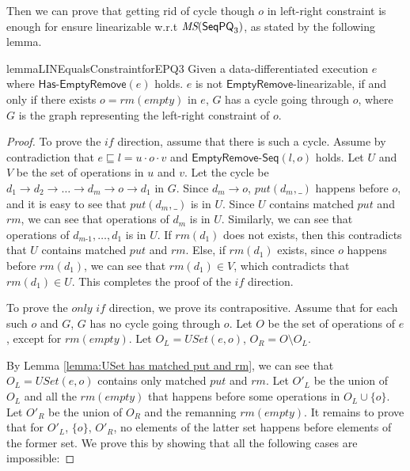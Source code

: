 Then we can prove that getting rid of cycle though $o$ in left-right constraint is enough for ensure linearizable w.r.t $\textit{MS}(\mathsf{SeqPQ}_3)$, as stated by the following lemma.


\begin{restatable}{lemma}{LINEqualsConstraintforEPQ3}
\label{lemma:Lin Equals Constraint for EPQ3}
Given a data-differentiated execution $e$ where $\mathsf{Has\text{-}EmptyRemove}(e)$ holds. $e$ is not $\mathsf{EmptyRemove}$-linearizable, if and only if there exists $o = \textit{rm}(\textit{empty})$ in $e$, $G$ has a cycle going through $o$, where $G$ is the graph representing the left-right constraint of $o$. 
\end{restatable}

\begin {proof}

To prove the $\textit{if}$ direction, assume that there is such a cycle. Assume by contradiction that $e \sqsubseteq l= u \cdot o \cdot v$ and $\mathsf{EmptyRemove\text{-}Seq}(l,o)$ holds. Let $U$ and $V$ be the set of operations in $u$ and $v$. Let the cycle be $d_1 \rightarrow d_2 \rightarrow \ldots \rightarrow d_m \rightarrow o \rightarrow d_1$ in $G$. Since $d_m \rightarrow o$, $\textit{put}(d_m,\_)$ happens before $o$, and it is easy to see that $\textit{put}(d_m,\_)$ is in $U$. Since $U$ contains matched $\textit{put}$ and $\textit{rm}$, we can see that operations of $d_m$ is in $U$. Similarly, we can see that operations of $d_{\textit{m-1}},\ldots,d_1$ is in $U$. If $\textit{rm}(d_1)$ does not exists, then this contradicts that $U$ contains matched $\textit{put}$ and $\textit{rm}$. Else, if $\textit{rm}(d_1)$ exists, since $o$ happens before $\textit{rm}(d_1)$, we can see that $\textit{rm}(d_1) \in V$, which contradicts that $\textit{rm}(d_1) \in U$. This completes the proof of the $\textit{if}$ direction.

To prove the $\textit{only if}$ direction, we prove its contrapositive. Assume that for each such $o$ and $G$, $G$ has no cycle going through $o$. Let $O$ be the set of operations of $e$, except for $\textit{rm}(\textit{empty})$. Let $O_L = \textit{USet}(e,o)$, $O_R = O \setminus O_L$.

By Lemma \ref{lemma:USet has matched put and rm}, we can see that $O_L = \textit{USet}(e,o)$ contains only matched $\textit{put}$ and $\textit{rm}$. Let $O'_L$ be the union of $O_L$ and all the $\textit{rm}(\textit{empty})$ that happens before some operations in $O_L \cup \{ o \}$. Let $O'_R$ be the union of $O_R$ and the remanning $\textit{rm}(\textit{empty})$. It remains to prove that for $O'_L$, $\{ o \}$, $O'_R$, no elements of the latter set happens before elements of the former set. We prove this by showing that all the following cases are impossible:


\end{proof}

